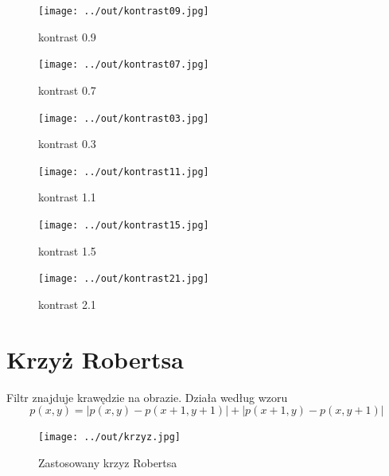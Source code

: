\documentclass[a4paper,12pt]{article}
\begin{document}
\begin{figure}[h!]
\begin{minipage}[t]{5cm}
\begin{center}
\texttt{[image: ../out/kontrast09.jpg]}
\caption{kontrast 0.9}
\end{center}
\end{minipage}
\hfill
\begin{minipage}[t]{5cm}
\begin{center}
\texttt{[image: ../out/kontrast07.jpg]}
\caption{kontrast 0.7}
\end{center}
\end{minipage}
\hfill
\begin{minipage}[t]{5cm}
\begin{center}
\texttt{[image: ../out/kontrast03.jpg]}
\caption{kontrast 0.3}
\end{center}
\end{minipage}
\end{figure}

\begin{figure}[h!]
\begin{minipage}[t]{5cm}
\begin{center}
\texttt{[image: ../out/kontrast11.jpg]}
\caption{kontrast 1.1}
\end{center}
\end{minipage}
\hfill
\begin{minipage}[t]{5cm}
\begin{center}
\texttt{[image: ../out/kontrast15.jpg]}
\caption{kontrast 1.5}
\end{center}
\end{minipage}
\hfill
\begin{minipage}[t]{5cm}
\begin{center}
\texttt{[image: ../out/kontrast21.jpg]}
\caption{kontrast 2.1}
\end{center}
\end{minipage}
\end{figure}



\newpage
\section{Krzyż Robertsa}
Filtr znajduje krawędzie na obrazie. Działa według wzoru
$$p(x,y) = |p(x,y)-p(x+1,y+1)| + |p(x+1,y)-p(x,y+1)|$$



\begin{figure}[h!]
   \centering
   \texttt{[image: ../out/krzyz.jpg]}
   \caption{Zastosowany krzyz Robertsa}
\end{figure}
\end{document}

